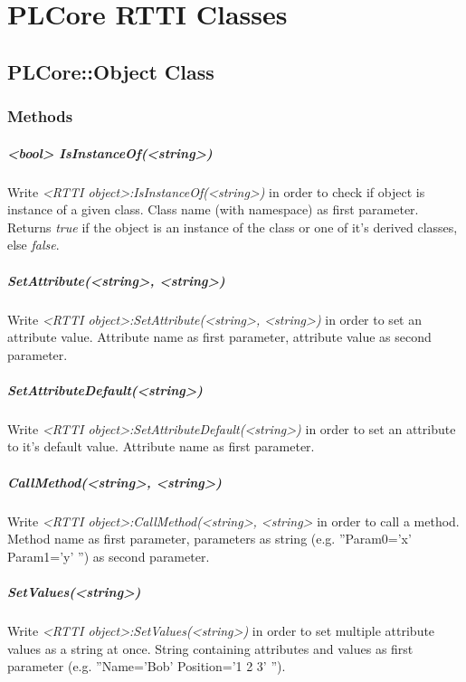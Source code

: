 \chapter{PLCore RTTI Classes}




\section{PLCore::Object Class}


\subsection{Methods}

\paragraph{<bool> IsInstanceOf(<string>)}
Write \emph{<RTTI object>:IsInstanceOf(<string>)} in order to check if object is instance of a given class. Class name (with namespace) as first parameter. Returns \emph{true} if the object is an instance of the class or one of it's derived classes, else \emph{false}.

\paragraph{SetAttribute(<string>, <string>)}
Write \emph{<RTTI object>:SetAttribute(<string>, <string>)} in order to set an attribute value. Attribute name as first parameter, attribute value as second parameter.

\paragraph{SetAttributeDefault(<string>)}
Write \emph{<RTTI object>:SetAttributeDefault(<string>)} in order to set an attribute to it's default value. Attribute name as first parameter.

\paragraph{CallMethod(<string>, <string>)}
Write \emph{<RTTI object>:CallMethod(<string>, <string>} in order to call a method. Method name as first parameter, parameters as string (e.g. ''Param0='x' Param1='y' '') as second parameter.

\paragraph{SetValues(<string>)}
Write \emph{<RTTI object>:SetValues(<string>)} in order to set multiple attribute values as a string at once. String containing attributes and values as first parameter (e.g. ''Name='Bob' Position='1 2 3' '').

